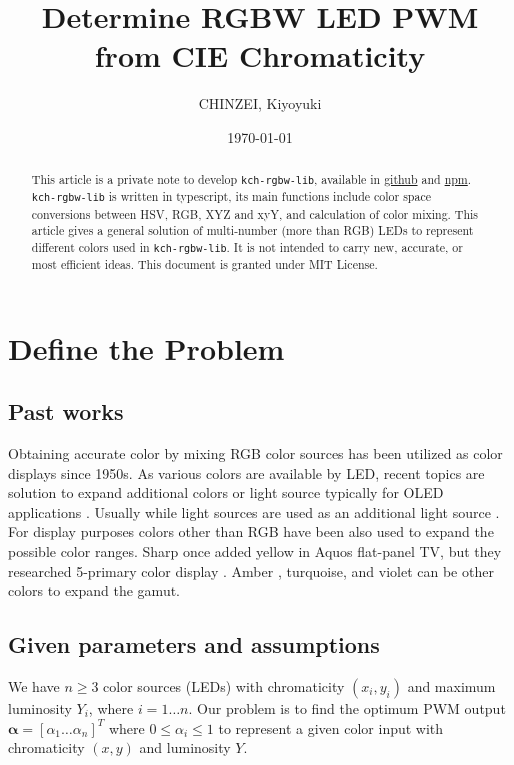 \documentclass[dvipdfmx,uplatex]{article}
\title{Determine RGBW LED PWM from CIE Chromaticity}
\author{CHINZEI, Kiyoyuki}
\date{\today}
\begin{document}
\maketitle

\begin{abstract}
This article is a private note to develop \lstinline$kch-rgbw-lib$, available in \href{https://github.com/kchinzei/kch-rgbw-lib}{github} and \href{https://www.npmjs.com/package/kch-rgbw-lib}{npm}. \lstinline$kch-rgbw-lib$ is written in typescript, its main functions include color space conversions between HSV, RGB, XYZ and xyY, and calculation of color mixing. This article gives a general solution of multi-number (more than RGB) LEDs to represent different colors used in \lstinline$kch-rgbw-lib$. It is not intended to carry new, accurate, or most efficient ideas. This document is granted under MIT License.
\end{abstract}

\section{Define the Problem}
\subsection{Past works}\label{s_intro}
Obtaining accurate color by mixing RGB color sources has been utilized as color displays since 1950s. As various colors are available by LED, recent topics are solution to expand additional colors or light source typically for OLED applications \cite{Chi2011, Lee2014}. Usually while light sources are used as an additional light source \cite{AN1562, Chi2011, Lee2014}. For display purposes colors other than RGB have been also used to expand the possible color ranges\cite{Wikipedia_multicolor}. Sharp once added yellow in Aquos flat-panel TV, but they researched 5-primary color display \cite{Sharp2011}. Amber \cite{AN2026}, turquoise, and violet can be other colors to expand the gamut.

\subsection{Given parameters and assumptions}\label{s_assumptions}
We have $n \geq 3$ color sources (LEDs) with chromaticity $(x_i, y_i)$ and maximum luminosity $Y_i$, where $i=1 \ldots n$. Our problem is to find the optimum PWM output $\boldsymbol{\alpha} = [\alpha_1 \ldots \alpha_n]^T$ where $0 \leq \alpha_i \leq 1$ to represent a given color input with chromaticity $(x, y)$ and luminosity $Y$.
\end{document}
